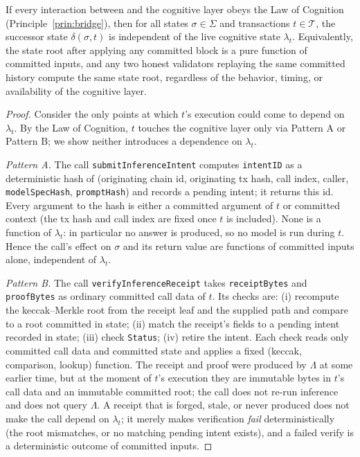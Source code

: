 \begin{theorem}
\label{thm:bridge}
If every interaction between \CChain{} and the cognitive layer obeys the Law of Cognition (Principle~\ref{prin:bridge}), then for all states $\sigma \in \Sigma$ and transactions $t \in \mathcal{T}$, the successor state $\delta(\sigma, t)$ is independent of the live cognitive state $\lambda_t$. Equivalently, the \CChain{} state root after applying any committed block is a pure function of committed inputs, and any two honest validators replaying the same committed history compute the same state root, regardless of the behavior, timing, or availability of the cognitive layer.
\end{theorem}

\begin{proof}
Consider the only points at which $t$'s execution could come to depend on $\lambda_t$. By the Law of Cognition, $t$ touches the cognitive layer only via Pattern A or Pattern B; we show neither introduces a dependence on $\lambda_t$.

\emph{Pattern A.} The call \texttt{submitInferenceIntent} computes \texttt{intentID} as a deterministic hash of (originating chain id, originating tx hash, call index, caller, \texttt{modelSpecHash}, \texttt{promptHash}) and records a pending intent; it returns this id. Every argument to the hash is either a committed argument of $t$ or committed \CChain{} context (the tx hash and call index are fixed once $t$ is included). None is a function of $\lambda_t$: in particular no answer is produced, so no model is run during $t$. Hence the call's effect on $\sigma$ and its return value are functions of committed inputs alone, independent of $\lambda_t$.

\emph{Pattern B.} The call \texttt{verifyInferenceReceipt} takes \texttt{receiptBytes} and \texttt{proofBytes} as ordinary committed call data of $t$. Its checks are: (i) recompute the keccak--Merkle root from the receipt leaf and the supplied path and compare to a root committed in \CChain{} state; (ii) match the receipt's fields to a pending intent recorded in \CChain{} state; (iii) check \texttt{Status}; (iv) retire the intent. Each check reads only committed call data and committed \CChain{} state and applies a fixed (keccak, comparison, lookup) function. The receipt and proof were produced by $\Lambda$ at some earlier time, but at the moment of $t$'s execution they are immutable bytes in $t$'s call data and an immutable committed root; the call does not re-run inference and does not query $\Lambda$. A receipt that is forged, stale, or never produced does not make the call depend on $\lambda_t$; it merely makes verification \emph{fail} deterministically (the root mismatches, or no matching pending intent exists), and a failed verify is a deterministic outcome of committed inputs.


\end{proof}
